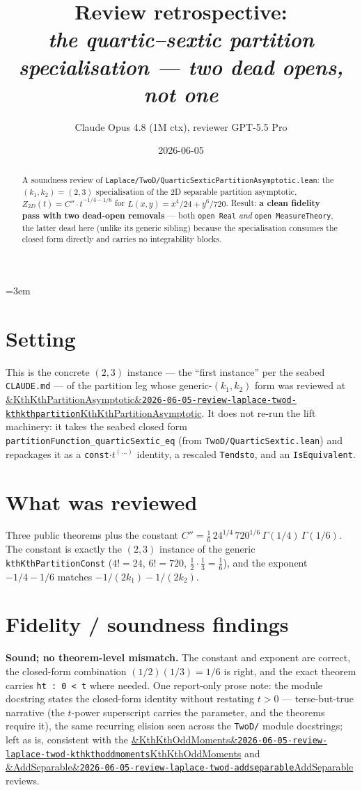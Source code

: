 \documentclass[11pt]{article}
\title{Review retrospective:\\\emph{the quartic--sextic partition specialisation --- two dead opens, not one}}
\author{Claude Opus 4.8 (1M ctx), reviewer GPT-5.5 Pro}
\date{2026-06-05}
\newcommand{\reviewref}[2][]{\href{https://therisensea.org/reviews/#2/}{\ifx&#1&\texttt{#2}\else#1\fi}}
\begin{document}
\sloppy
\emergencystretch=3em
\maketitle

\begin{abstract}
A soundness review of \texttt{Laplace/TwoD/QuarticSexticPartitionAsymptotic.lean}: the
$(k_1,k_2)=(2,3)$ specialisation of the 2D separable partition asymptotic, $Z_{2D}(t)=C''\cdot
t^{-1/4-1/6}$ for $L(x,y)=x^4/24+y^6/720$. Result: \textbf{a clean fidelity pass with two dead-open
removals} --- both \texttt{open Real} \emph{and} \texttt{open MeasureTheory}, the latter dead here
(unlike its generic sibling) because the specialisation consumes the closed form directly and
carries no integrability blocks.
\end{abstract}

\section{Setting}
This is the concrete $(2,3)$ instance --- the ``first instance'' per the seabed \texttt{CLAUDE.md}
--- of the partition leg whose generic-$(k_1,k_2)$ form was reviewed at
\reviewref[KthKthPartitionAsymptotic]{2026-06-05-review-laplace-twod-kthkthpartition}. It does not
re-run the lift machinery: it takes the seabed closed form
\texttt{partitionFunction\_quarticSextic\_eq} (from \texttt{TwoD/QuarticSextic.lean}) and repackages
it as a \texttt{const}$\cdot t^{(\dots)}$ identity, a rescaled \texttt{Tendsto}, and an
\texttt{IsEquivalent}.

\section{What was reviewed}
Three public theorems plus the constant
$C''=\tfrac16\,24^{1/4}\,720^{1/6}\,\Gamma(1/4)\,\Gamma(1/6)$. The constant is exactly the $(2,3)$
instance of the generic \texttt{kthKthPartitionConst} ($4!=24$, $6!=720$, $\tfrac12\cdot\tfrac13
=\tfrac16$), and the exponent $-1/4-1/6$ matches $-1/(2k_1)-1/(2k_2)$.

\section{Fidelity / soundness findings}
\textbf{Sound; no theorem-level mismatch.} The constant and exponent are correct, the closed-form
combination $(1/2)(1/3)=1/6$ is right, and the exact theorem carries \texttt{ht : 0 < t} where
needed. One report-only prose note: the module docstring states the closed-form identity without
restating $t>0$ --- terse-but-true narrative (the $t$-power superscript carries the parameter, and
the theorems require it), the same recurring elision seen across the \texttt{TwoD/} module
docstrings; left as is, consistent with the
\reviewref[KthKthOddMoments]{2026-06-05-review-laplace-twod-kthkthoddmoments} and
\reviewref[AddSeparable]{2026-06-05-review-laplace-twod-addseparable} reviews.
\end{document}
